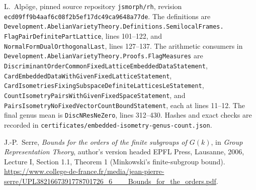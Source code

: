 L.~Alp\"oge, pinned source repository \texttt{jsmorph/rh},
revision \texttt{ecd09ff9b4aaf6c08f2b5ef17dc49ca9648a77de}.
The definitions are
\texttt{Development.Abelian\allowbreak Variety\allowbreak Theory.Definitions.Semilocal\allowbreak Frames.}
\texttt{FlagPairDefinitePartLattice}, lines 101--122, and
\texttt{NormalFormDualOrthogonalLast}, lines 127--137.
The arithmetic consumers in
\texttt{Development.Abelian\allowbreak Variety\allowbreak Theory.Proofs.Flag\allowbreak Measures}
are \texttt{Discriminant\allowbreak Order\allowbreak Common\allowbreak Fixed\allowbreak Lattice\allowbreak Embedded\allowbreak Data\allowbreak Statement},
\texttt{Card\allowbreak Embedded\allowbreak Data\allowbreak With\allowbreak Given\allowbreak Fixed\allowbreak Lattice\allowbreak Statement},
\texttt{Card\allowbreak Isometries\allowbreak Fixing\allowbreak Subspace\allowbreak Definite\allowbreak Lattices\allowbreak Le\allowbreak Statement},
\texttt{Count\allowbreak Isometry\allowbreak Pairs\allowbreak With\allowbreak Given\allowbreak Fixed\allowbreak Space\allowbreak Statement},
and \texttt{Pairs\allowbreak Isometry\allowbreak No\allowbreak Fixed\allowbreak Vector\allowbreak Count\allowbreak Bound\allowbreak Statement},
each at lines 11--12.  The final genus mean is
\texttt{DiscNResNeZero}, lines 312--430.
Hashes and exact checks are recorded in
\texttt{certificates/embedded-isometry-genus-count.json}.

J.-P.~Serre, \emph{Bounds for the orders of the finite subgroups
of \(G(k)\)}, in \emph{Group Representation Theory},
author's version headed EPFL Press, Lausanne, 2006,
Lecture I, Section 1.1, Theorem 1
(Minkowski's finite-subgroup bound).
\url{https://www.college-de-france.fr/media/jean-pierre-serre/UPL3821667391778701726_6___Bounds_for_the_orders.pdf}.
